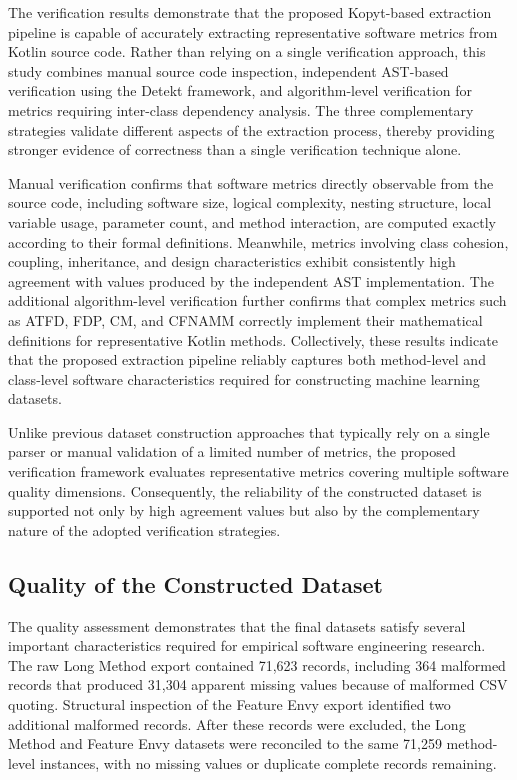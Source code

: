 \documentclass[]{einformatica}
\begin{document}
The verification results demonstrate that the proposed Kopyt-based extraction pipeline is capable of accurately extracting representative software metrics from Kotlin source code. Rather than relying on a single verification approach, this study combines manual source code inspection, independent AST-based verification using the Detekt framework, and algorithm-level verification for metrics requiring inter-class dependency analysis. The three complementary strategies validate different aspects of the extraction process, thereby providing stronger evidence of correctness than a single verification technique alone.

Manual verification confirms that software metrics directly observable from the source code, including software size, logical complexity, nesting structure, local variable usage, parameter count, and method interaction, are computed exactly according to their formal definitions. Meanwhile, metrics involving class cohesion, coupling, inheritance, and design characteristics exhibit consistently high agreement with values produced by the independent AST implementation. The additional algorithm-level verification further confirms that complex metrics such as ATFD, FDP, CM, and CFNAMM correctly implement their mathematical definitions for representative Kotlin methods. Collectively, these results indicate that the proposed extraction pipeline reliably captures both method-level and class-level software characteristics required for constructing machine learning datasets.

Unlike previous dataset construction approaches that typically rely on a single parser or manual validation of a limited number of metrics, the proposed verification framework evaluates representative metrics covering multiple software quality dimensions. Consequently, the reliability of the constructed dataset is supported not only by high agreement values but also by the complementary nature of the adopted verification strategies.

\subsection{Quality of the Constructed Dataset}

The quality assessment demonstrates that the final datasets satisfy several important characteristics required for empirical software engineering research. The raw Long Method export contained 71,623 records, including 364 malformed records that produced 31,304 apparent missing values because of malformed CSV quoting. Structural inspection of the Feature Envy export identified two additional malformed records. After these records were excluded, the Long Method and Feature Envy datasets were reconciled to the same 71,259 method-level instances, with no missing values or duplicate complete records remaining.
\end{document}
